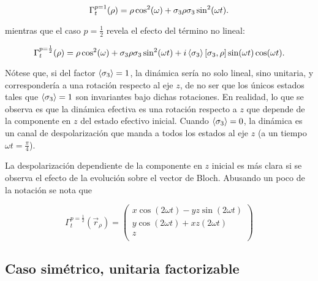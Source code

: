 \begin{equation*}
    \Gamma_{t}^{p=1}(\rho)=\rho \cos^{2}(\omega)+\sigma_{3} \rho \sigma_{3} \sin^{2}(\omega t).
\end{equation*}

mientras que el caso $p=\frac{1}{2}$ revela el efecto del término no lineal:

\begin{equation*}
    \Gamma_{t}^{p=\frac{1}{2}}(\rho)=\rho \cos^{2}(\omega)+\sigma_{3} \rho \sigma_{3} \sin^{2}(\omega t) + i\expval{\sigma_{3}} \qty[\sigma_{3},\rho] \sin(\omega t)\cos(\omega t).
\end{equation*}

Nótese que, si del factor $\expval{\sigma_{3}}=1$, la dinámica sería no solo lineal, sino unitaria, y correspondería a una rotación respecto al eje $z$, de no ser que los únicos estados tales que $\expval{\sigma_{3}}=1$ son invariantes bajo dichas rotaciones. En realidad, lo que se observa es que la dinámica efectiva es una rotación respecto a $z$ que depende de la componente en $z$ del estado efectivo inicial. Cuando $\expval{\sigma_{3}}=0$, la dinámica es un canal de despolarización que manda a todos los estados al eje $z$ (a un tiempo $\omega t =\frac{\pi}{4}$). 


La despolarización dependiente de la componente en $z$ inicial es más clara si se observa el efecto de la evolución sobre el vector de Bloch. Abusando un poco de la notación se nota que 

\begin{equation*}
    \Gamma_{t}^{p=\frac{1}{2}}(\vec{r}_{\rho})=\begin{pmatrix}
        x\cos(2\omega t)-yz\sin(2\omega t)\\
        y\cos(2\omega t)+xz(2\omega t)\\
        z\\
    \end{pmatrix}
\end{equation*}


\subsection{Caso simétrico, unitaria factorizable}


